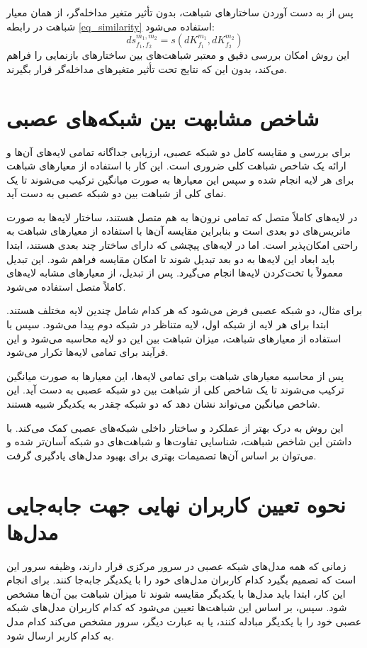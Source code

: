 پس از به دست آوردن ساختارهای شباهت، بدون تأثیر متغیر مداخله‌گر، از همان معیار شباهت در رابطه
\eqref{eq_similarity}
استفاده می‌شود:
\begin{equation}
	ds^{m_1,m_2}_{f_1,f_2} = s(dK^{m_1}_{f_1}, dK^{m_2}_{f_2})
\end{equation}
این روش امکان بررسی دقیق و معتبر شباهت‌های بین ساختارهای بازنمایی را فراهم می‌کند، بدون این که نتایج تحت تأثیر متغیرهای مداخله‌گر قرار بگیرند.



\section{شاخص مشابهت بین شبکه‌های عصبی}
برای بررسی و مقایسه کامل دو شبکه عصبی، ارزیابی جداگانه تمامی لایه‌های آن‌ها و ارائه یک شاخص شباهت کلی ضروری است. این کار با استفاده از معیارهای شباهت برای هر لایه انجام شده و سپس این معیارها به صورت میانگین ترکیب می‌شوند تا یک نمای کلی از شباهت بین دو شبکه عصبی به دست آید.

در لایه‌های کاملاً متصل%
که تمامی نرون‌ها به هم متصل هستند، ساختار لایه‌ها به صورت ماتریس‌های دو بعدی است و بنابراین مقایسه آن‌ها با استفاده از معیارهای شباهت به راحتی امکان‌پذیر است. اما در لایه‌های پیچشی%
که دارای ساختار چند بعدی هستند، ابتدا باید ابعاد این لایه‌ها به دو بعد تبدیل شوند تا امکان مقایسه فراهم شود. این تبدیل معمولاً با تخت‌کردن%
لایه‌ها انجام می‌گیرد. پس از تبدیل، از معیارهای مشابه لایه‌های کاملاً متصل استفاده می‌شود.

برای مثال، دو شبکه عصبی فرض می‌شود که هر کدام شامل چندین لایه مختلف هستند. ابتدا برای هر لایه از شبکه اول، لایه متناظر در شبکه دوم پیدا می‌شود. سپس با استفاده از معیارهای شباهت، میزان شباهت بین این دو لایه محاسبه می‌شود و این فرآیند برای تمامی لایه‌ها تکرار می‌شود.

پس از محاسبه معیارهای شباهت برای تمامی لایه‌ها، این معیارها به صورت میانگین ترکیب می‌شوند تا یک شاخص کلی از شباهت بین دو شبکه عصبی به دست آید. این شاخص میانگین می‌تواند نشان دهد که دو شبکه چقدر به یکدیگر شبیه هستند.

این روش به درک بهتر از عملکرد و ساختار داخلی شبکه‌های عصبی کمک می‌کند. با داشتن این شاخص شباهت، شناسایی تفاوت‌ها و شباهت‌های دو شبکه آسان‌تر شده و می‌توان بر اساس آن‌ها تصمیمات بهتری برای بهبود مدل‌های یادگیری گرفت.



\section{نحوه تعیین کاربران نهایی جهت جابه‌جایی مدل‌ها}
زمانی که همه مدل‌های شبکه عصبی در سرور مرکزی قرار دارند، وظیفه سرور این است که تصمیم بگیرد کدام کاربران مدل‌های خود را با یکدیگر جابه‌جا کنند. برای انجام این کار، ابتدا باید مدل‌ها با یکدیگر مقایسه شوند تا میزان شباهت بین آن‌ها مشخص شود. سپس، بر اساس این شباهت‌ها تعیین می‌شود که کدام کاربران مدل‌های شبکه عصبی خود را با یکدیگر مبادله کنند، یا به عبارت دیگر، سرور مشخص می‌کند کدام مدل به کدام کاربر ارسال شود.

